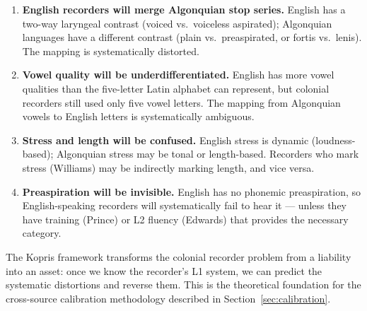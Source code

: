 \begin{enumerate}
  \item \textbf{English recorders will merge Algonquian stop series.} English
    has a two-way laryngeal contrast (voiced vs.\ voiceless aspirated);
    Algonquian languages have a different contrast (plain vs.\ preaspirated,
    or fortis vs.\ lenis). The mapping is systematically distorted.

  \item \textbf{Vowel quality will be underdifferentiated.} English has more
    vowel qualities than the five-letter Latin alphabet can represent, but
    colonial recorders still used only five vowel letters. The mapping from
    Algonquian vowels to English letters is systematically ambiguous.

  \item \textbf{Stress and length will be confused.} English stress is
    dynamic (loudness-based); Algonquian stress may be tonal or length-based.
    Recorders who mark stress (Williams) may be indirectly marking length,
    and vice versa.

  \item \textbf{Preaspiration will be invisible.} English has no phonemic
    preaspiration, so English-speaking recorders will systematically fail to
    hear it --- unless they have training (Prince) or L2 fluency (Edwards)
    that provides the necessary category.
\end{enumerate}

The Kopris framework transforms the colonial recorder problem from a
liability into an asset: once we know the recorder's L1 system, we can
predict the systematic distortions and reverse them. This is the theoretical
foundation for the cross-source calibration methodology described in
Section~\ref{sec:calibration}.
